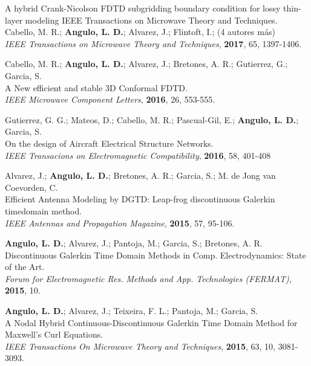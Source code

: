 \documentclass[a4paper,margin,line]{res}
\begin{document}
\begin{resume}
\begin{minipage}{\textwidth}
  A hybrid Crank-Nicolson FDTD subgridding boundary condition for lossy thin-layer modeling IEEE Transactions on Microwave Theory and Techniques.\\
  Cabello, M. R.; \textbf{Angulo, L. D.}; Alvarez, J.; Flintoft, I.; (4 autores más)\\
  {\it IEEE Transactions on Microwave Theory and Techniques}, {\bf 2017}, 65, 1397-1406.
\end{minipage}

\begin{minipage}{\textwidth}
  Cabello, M. R.; \textbf{Angulo, L. D.}; Alvarez, J.; Bretones, A. R.; Gutierrez, G.; Garcia, S.\\
  A New efficient and stable 3D Conformal FDTD.\\
  {\it IEEE Microwave Component Letters}, {\bf 2016}, 26, 553-555.
\end{minipage}

\begin{minipage}{\textwidth}
  Gutierrez, G. G.; Mateos, D.; Cabello, M. R.; Pascual-Gil, E.; \textbf{Angulo, L. D.}; Garcia, S.\\
  On the design of Aircraft Electrical Structure Networks.\\
  \textit{IEEE Transacions on Electromagnetic Compatibility}, \textbf{2016}, 58, 401-408
\end{minipage}

Alvarez, J.; {\bf Angulo, L. D.}; Bretones, A. R.; Garcia, S.; M. de Jong van Coevorden, C.\\
Efficient Antenna Modeling by DGTD: Leap-frog discontinuous Galerkin timedomain method. \\
{\it IEEE Antennas and Propagation Magazine}, {\bf 2015}, 57, 95-106.

{\bf Angulo, L. D.}; Alvarez, J.; Pantoja, M.; Garcia, S.; Bretones, A. R.\\
Discontinuous Galerkin Time Domain Methods in Comp. Electrodynamics: State of the Art.\\
{\it Forum for Electromagnetic Res. Methods and App. Technologies (FERMAT)}, {\bf 2015}, 10.

{\bf Angulo, L. D.}; Alvarez, J.; Teixeira, F. L.; Pantoja, M.; Garcia, S.\\
A Nodal Hybrid Continuous-Discontinuous Galerkin Time Domain Method for Maxwell's Curl Equations.\\
{\it IEEE Transactions On Microwave Theory and Techniques}, {\bf 2015}, 63, 10, 3081-3093.


\end{resume}
\end{document}
